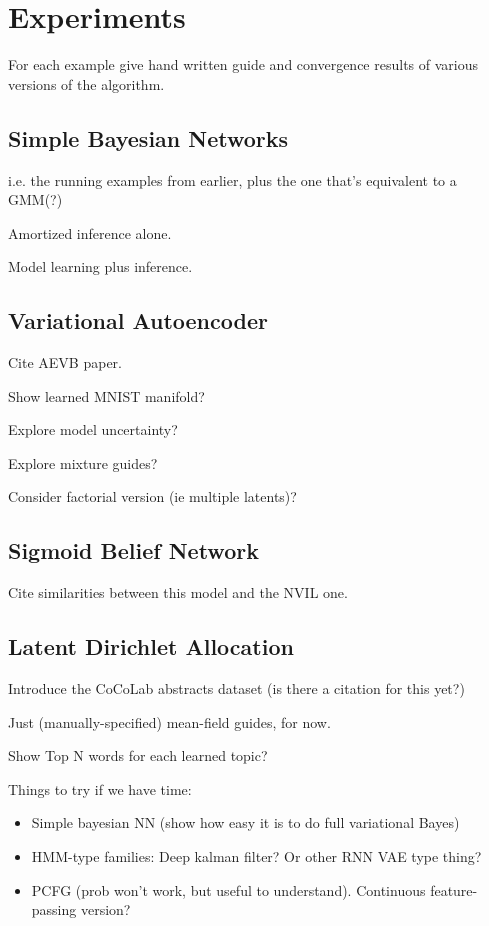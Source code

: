 \section{Experiments}
\label{sec:results}

For each example give hand written guide and convergence results of various versions of the algorithm.


\subsection{Simple Bayesian Networks}
\label{sec:results_bn}

i.e. the running examples from earlier, plus the one that's equivalent to a GMM(?)

Amortized inference alone.

Model learning plus inference.


\subsection{Variational Autoencoder}
\label{sec:results_vae}

Cite AEVB paper.

Show learned MNIST manifold?

Explore model uncertainty?

Explore mixture guides?

Consider factorial version (ie multiple latents)?


\subsection{Sigmoid Belief Network}
\label{sec:results_sbn}

Cite similarities between this model and the NVIL one.


\subsection{Latent Dirichlet Allocation}
\label{sec:results_lda}

Introduce the CoCoLab abstracts dataset (is there a citation for this yet?)

Just (manually-specified) mean-field guides, for now.

Show Top N words for each learned topic?


Things to try if we have time:
\begin{itemize}
\item{Simple bayesian NN (show how easy it is to do full variational Bayes)}
\item{HMM-type families: Deep kalman filter? Or other RNN VAE type thing?}
\item{PCFG (prob won’t work, but useful to understand). Continuous feature-passing version?}
\end{itemize}

